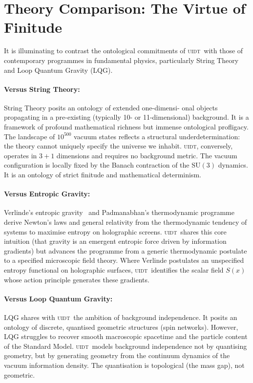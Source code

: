 \documentclass[12pt,a4paper,twoside]{article}
\theoremstyle{plain}
\theoremstyle{definition}
\theoremstyle{remark}
\newcommand{\UIDT}{\textsc{uidt}}
\newcommand{\Sx}{S(x)}
\begin{document}
\section{Theory Comparison: The Virtue of Finitude}
\label{sec:comparison}

It is illuminating to contrast the ontological commitments of \UIDT\ with those
of contemporary programmes in fundamental physics, particularly String Theory
and Loop Quantum Gravity (LQG).
\vspace{-0.3em}
\paragraph{Versus String Theory:}
String Theory posits an ontology of extended one-dimensi-
onal objects propagating in a pre-existing (typically 10- or 11-dimensional) background. It is a framework of profound mathematical richness but immense ontological profligacy. The landscape of $10^{500}$ vacuum states reflects a structural underdetermination: the theory cannot uniquely specify the universe we inhabit. \UIDT, conversely, operates in $3+1$ dimensions and requires no background metric. The vacuum configuration is locally fixed by the Banach contraction of the $\mathrm{SU}(3)$ dynamics. It is an ontology of strict finitude and mathematical determinism.
\vspace{-0.9em}
\paragraph{Versus Entropic Gravity:}
Verlinde's entropic gravity~\cite{Verlinde2011} and Padmanabhan's thermodynamic
programme~\cite{Padmanabhan2010} derive Newton's laws and general relativity from the thermodynamic tendency of systems to maximise entropy on holographic screens. \UIDT\ shares this core intuition (that gravity is an emergent entropic force driven by information gradients) but advances the programme from a generic thermodynamic postulate to a specified microscopic field theory. Where Verlinde postulates an unspecified entropy functional on holographic surfaces, \UIDT\ identifies the scalar field $\Sx$ whose action principle generates these gradients.
\vspace{-0.9em}
\paragraph{Versus Loop Quantum Gravity:}
LQG shares with \UIDT\ the ambition of background independence. It posits an
ontology of discrete, quantised geometric structures (spin networks). However,
LQG struggles to recover smooth macroscopic spacetime and the particle content
of the Standard Model. \UIDT\ models background independence not by
quantising geometry, but by generating geometry from the continuum dynamics of
the vacuum information density. The quantisation is topological (the mass
gap), not geometric.
\vspace{-0.9em}
\end{document}
